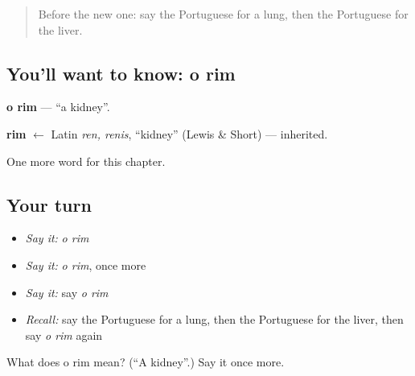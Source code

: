 \begin{quote}
Before the new one: say the Portuguese for a lung, then the Portuguese for the liver.
\end{quote}

\subsection*{You'll want to know: o rim}
\textbf{o rim} — \textquotedblleft{}a kidney\textquotedblright{}.

\begin{cousinweb}
\textbf{rim} $\leftarrow$ Latin \emph{ren, renis}, \textquotedblleft{}kidney\textquotedblright{} (Lewis \& Short) — inherited.
\end{cousinweb}

\begin{grammarlens}[title={What you've built}]
One more word for this chapter.
\end{grammarlens}

\subsection*{Your turn}
\begin{itemize}
\raggedright
  \item \emph{Say it:} \emph{o rim}
  \item \emph{Say it:} \emph{o rim}, once more
  \item \emph{Say it:} say \emph{o rim}
  \item \emph{Recall:} say the Portuguese for a lung, then the Portuguese for the liver, then say \emph{o rim} again
\end{itemize}

\begin{tcolorbox}[breakable,colback=teal!4,colframe=teal!35!black,title={Before you move on}]
What does o rim mean? (\textquotedblleft{}A kidney\textquotedblright{}.) Say it once more.
\end{tcolorbox}

